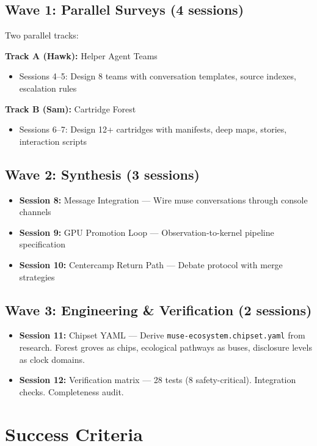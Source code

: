 \documentclass[11pt,letterpaper]{article}
\begin{document}
\subsection{Wave 1: Parallel Surveys (4 sessions)}

Two parallel tracks:

\textbf{Track A (Hawk):} Helper Agent Teams
\begin{itemize}
\item Sessions 4--5: Design 8 teams with conversation templates, source indexes, escalation rules
\end{itemize}

\textbf{Track B (Sam):} Cartridge Forest
\begin{itemize}
\item Sessions 6--7: Design 12+ cartridges with manifests, deep maps, stories, interaction scripts
\end{itemize}

\subsection{Wave 2: Synthesis (3 sessions)}

\begin{itemize}
\item \textbf{Session 8:} Message Integration --- Wire muse conversations through console channels
\item \textbf{Session 9:} GPU Promotion Loop --- Observation-to-kernel pipeline specification
\item \textbf{Session 10:} Centercamp Return Path --- Debate protocol with merge strategies
\end{itemize}

\subsection{Wave 3: Engineering \& Verification (2 sessions)}

\begin{itemize}
\item \textbf{Session 11:} Chipset YAML --- Derive \texttt{muse-ecosystem.chipset.yaml} from research. Forest groves as chips, ecological pathways as buses, disclosure levels as clock domains.
\item \textbf{Session 12:} Verification matrix --- 28 tests (8 safety-critical). Integration checks. Completeness audit.
\end{itemize}

\section{Success Criteria}
\end{document}
